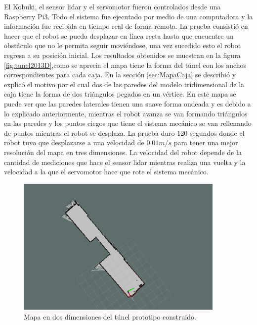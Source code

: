 El Kobuki, el sensor lidar y el servomotor fueron controlados desde una Raspberry Pi3. Todo 
el sistema fue ejecutado por medio de una computadora y la información fue recibida en tiempo 
real de forma remota. La prueba consistió en hacer que el robot se pueda desplazar en línea 
recta hasta que encuentre un obstáculo que no le permita seguir moviéndose, una vez sucedido 
esto el robot regresa a su posición inicial. Los resultados obtenidos se muestran en la figura
\ref{fig:tunel2013D},como se aprecia el mapa tiene la forma del túnel con los anchos correspondientes 
para cada caja. En la sección \ref{sec:MapaCaja} se describió y explicó el motivo por el cual dos 
de las paredes del modelo tridimensional de la caja tiene la forma de dos triángulos pegados en 
un vértice. En este mapa se puede ver que las paredes laterales tienen una suave forma ondeada 
y es debido a lo explicado anteriormente, mientras el robot avanza se van formando triángulos 
en las paredes y los puntos ciegos que tiene el sistema mecánico se van rellenando de puntos 
mientras el robot se desplaza. La prueba duro 120 segundos donde el robot tuvo que desplazarse 
a una velocidad de $0.01 m/s$ para tener una mejor resolución del mapa en tres dimensiones. La 
velocidad del robot depende de la cantidad de mediciones que hace el sensor lidar mientras 
realiza una vuelta y la velocidad a la que el servomotor hace que rote el sistema mecánico.

\begin{figure}
  \centering \footnotesize
  \includegraphics[width=0.90\textwidth]{images/2DSotanoSLAM.png}
  \captionsetup{font=footnotesize}
  \caption{Mapa en dos dimensiones del túnel prototipo construido.}
  \label{fig:SLAM201}
\end{figure}

